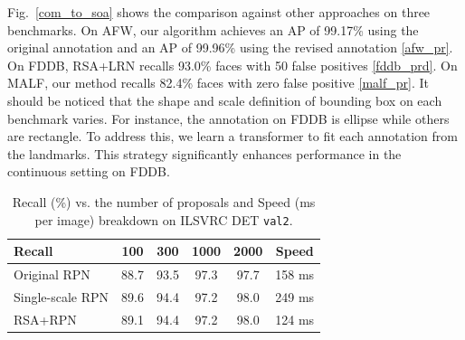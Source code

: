 \documentclass[10pt,twocolumn,letterpaper]{article}
\begin{document}
Fig.~\ref{com_to_soa} shows the comparison against other approaches on three benchmarks. On AFW, our algorithm achieves an AP of 99.17\% using the original annotation and an AP of 99.96\% using the revised  annotation \ref{afw_pr}. On FDDB, RSA+LRN recalls 93.0\% faces with 50 false positives \ref{fddb_prd}. On MALF, our method recalls 82.4\% faces with zero false positive \ref{malf_pr}. %
%
It should be noticed that the shape and scale definition of bounding box on each benchmark varies. For instance, the annotation on FDDB is ellipse while others are rectangle. To address this, we learn a transformer to fit each annotation from the landmarks. %
This strategy significantly enhances  performance  in the continuous setting on FDDB.


%


\begin{table}
	\caption{Recall (\%) vs. the number of proposals and Speed (ms per image) breakdown on ILSVRC DET \texttt{val2}.}
	\vspace{-.2cm}
	\begin{center}
		\footnotesize{
			\begin{tabular}{l|c c c c |c}
				\toprule
				Recall  		 & 100 	& 300 	& 1000 	& 2000 & Speed\\
				\midrule
				Original RPN 	 & 88.7 & 93.5 & 97.3 & 97.7 & 158 ms \\
				Single-scale RPN & 89.6 & 94.4 & 97.2 & 98.0 & 249 ms \\
				RSA+RPN 		 & 89.1 & 94.4 & 97.2 & 98.0 & 124 ms \\
				\bottomrule
			\end{tabular}
		}
	\end{center}
	\label{imgnt_test}
	\vspace{-.7cm}
\end{table}
\end{document}
